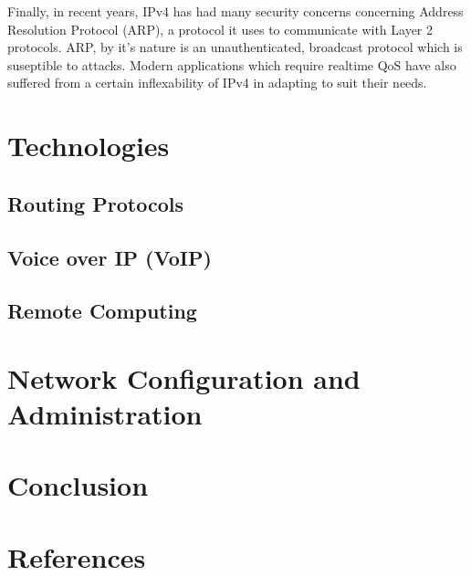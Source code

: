 \documentclass[a4paper,12pt]{article}
\begin{document}
Finally, in recent years, IPv4 has had many security concerns concerning
Address Resolution Protocol (ARP), a protocol it uses to communicate
with Layer 2 protocols. ARP, by it's nature is an unauthenticated, 
broadcast protocol which is suseptible to attacks. Modern applications
which require realtime QoS have also suffered from a certain
inflexability of IPv4 in adapting to suit their needs.

\section{Technologies}

\subsection{Routing Protocols}


\subsection{Voice over IP (VoIP)}


\subsection{Remote Computing}


\section{Network Configuration and Administration}


\section{Conclusion}


\section{References}
\end{document}
